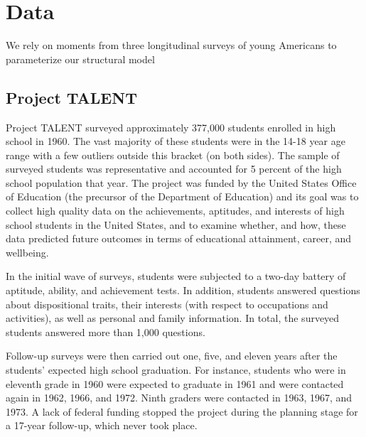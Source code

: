\documentclass[onehalfspacing,11pt]{article}
\begin{document}
\section{Data}\label{sec:data}

We rely on moments from three longitudinal surveys of young Americans to parameterize our structural model
\subsection{Project TALENT}

Project TALENT surveyed approximately 377,000 students enrolled in high school in 1960. The vast majority of these students were in the 14-18 year age range with a few outliers outside this bracket (on both sides). The sample of surveyed students was representative and accounted for 5 percent of the high school population that year. The project was funded by the United States Office of Education (the precursor of the Department of Education) and its goal was to collect high quality data on the achievements, aptitudes, and interests of high school students in the United States, and to examine whether, and how, these data predicted future outcomes in terms of educational attainment, career, and wellbeing.

In the initial wave of surveys, students were subjected to a two-day battery of aptitude, ability, and achievement tests. In addition, students answered questions about dispositional traits, their interests (with respect to occupations and activities), as well as personal and family information. 	In total, the surveyed students answered more than 1,000 questions.

Follow-up surveys were then carried out one, five, and eleven years after the students' expected high school graduation. For instance, students who were in eleventh grade in 1960 were expected to graduate in 1961 and were contacted again in 1962, 1966, and 1972. Ninth graders were contacted in 1963, 1967, and 1973. A lack of federal funding stopped the project during the planning stage for a 17-year follow-up, which never took place.
\end{document}
